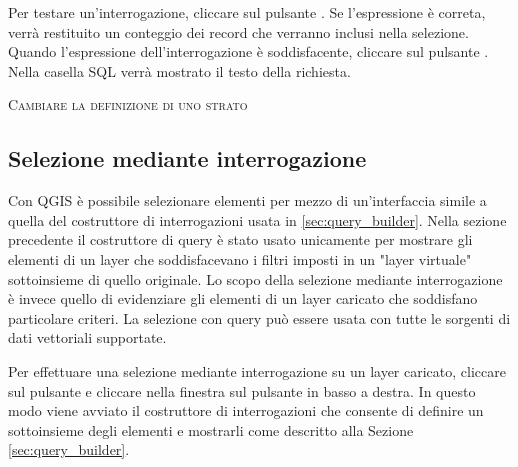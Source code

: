 Per testare un'interrogazione, cliccare sul pulsante 
. Se l'espressione è correta, verrà
restituito un conteggio dei record che verranno inclusi nella selezione.
Quando l'espressione dell'interrogazione è soddisfacente, cliccare sul
pulsante . Nella casella SQL verrà mostrato il testo della richiesta.

\begin{Tip}\caption{\textsc{Cambiare la definizione di uno strato}}
\end{Tip}

\subsection{Selezione mediante interrogazione}\label{sec:select_by_query}

Con QGIS è possibile selezionare elementi per mezzo di un'interfaccia simile a
quella del costruttore di interrogazioni usata in \ref{sec:query_builder}.
Nella sezione precedente il costruttore di query è stato usato unicamente per
mostrare gli elementi di un layer che soddisfacevano i filtri imposti in un
"layer virtuale" sottoinsieme di quello originale. Lo scopo della selezione
mediante interrogazione è invece quello di evidenziare gli elementi di un
layer caricato che soddisfano particolare criteri.
La selezione con query può essere usata con tutte le sorgenti di dati
vettoriali supportate.

Per effettuare una selezione mediante interrogazione su un layer caricato,
cliccare sul pulsante 
e cliccare nella finestra sul pulsante  in basso a
destra. In questo modo viene avviato il costruttore di interrogazioni che
consente di definire un sottoinsieme degli elementi e mostrarli come descritto
alla Sezione \ref{sec:query_builder}.


